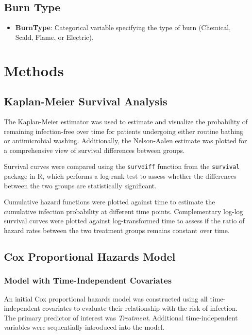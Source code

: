 \documentclass[12pt]{article}
\begin{document}
\subsection*{Burn Type}
\begin{itemize}
    \item \textbf{BurnType}: Categorical variable specifying the type of burn (Chemical, Scald, Flame, or Electric).
\end{itemize}

\section*{Methods}

\subsection*{Kaplan-Meier Survival Analysis}

The Kaplan-Meier estimator was used to estimate and visualize the probability of remaining infection-free over time for patients undergoing either routine bathing or antimicrobial washing. Additionally, the Nelson-Aalen estimate was plotted for a comprehensive view of survival differences between groups. 

Survival curves were compared using the \texttt{survdiff} function from the \texttt{survival} package in R, which performs a log-rank test to assess whether the differences between the two groups are statistically significant. 

Cumulative hazard functions were plotted against time to estimate the cumulative infection probability at different time points. Complementary log-log survival curves were plotted against log-transformed time to assess if the ratio of hazard rates between the two treatment groups remains constant over time. 

\subsection*{Cox Proportional Hazards Model}

\subsubsection*{Model with Time-Independent Covariates}

An initial Cox proportional hazards model was constructed using all time-independent covariates to evaluate their relationship with the risk of infection. The primary predictor of interest was \textit{Treatment}. Additional time-independent variables were sequentially introduced into the model.
\end{document}
